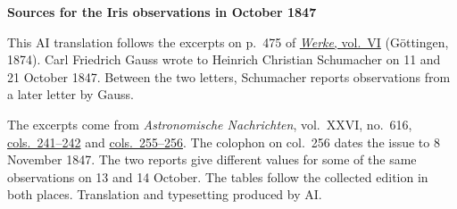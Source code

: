 \clearpage\thispagestyle{empty}
\begin{center}\textbf{Sources for the Iris observations in October 1847}\end{center}
\noindent This AI translation follows the excerpts on p.~475 of \href{https://gdz.sub.uni-goettingen.de/id/PPN236007467}{\textit{Werke}, vol.~VI} (Göttingen, 1874). Carl Friedrich Gauss wrote to Heinrich Christian Schumacher on 11 and 21 October 1847. Between the two letters, Schumacher reports observations from a later letter by Gauss.
\par\smallskip\noindent The excerpts come from \textit{Astronomische Nachrichten}, vol.~XXVI, no.~616, \href{https://api.digitale-sammlungen.de/iiif/image/v2/bsb10049451_00129/full/1800,/0/default.jpg}{cols.~241--242} and \href{https://api.digitale-sammlungen.de/iiif/image/v2/bsb10049451_00136/full/1800,/0/default.jpg}{cols.~255--256}. The colophon on col.~256 dates the issue to 8 November 1847. The two reports give different values for some of the same observations on 13 and 14 October. The tables follow the collected edition in both places. Translation and typesetting produced by AI.
\clearpage
